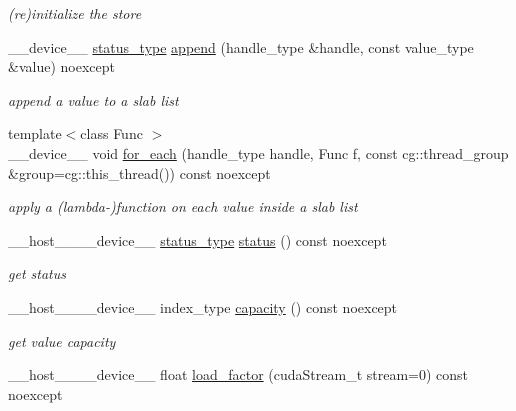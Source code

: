 \begin{DoxyCompactItemize}
\begin{DoxyCompactList}\small\item\em (re)initialize the store \end{DoxyCompactList}\item 
\+\_\+\+\_\+device\+\_\+\+\_\+ \hyperlink{classwarpcore_1_1Status}{status\+\_\+type} \hyperlink{classwarpcore_1_1storage_1_1multi__value_1_1StaticSlabListStore_a5433ed1a065db5277c6e4d3e6b55b628}{append} (handle\+\_\+type \&handle, const value\+\_\+type \&value) noexcept
\begin{DoxyCompactList}\small\item\em append a value to a slab list \end{DoxyCompactList}\item 
{\footnotesize template$<$class Func $>$ }\\\+\_\+\+\_\+device\+\_\+\+\_\+ void \hyperlink{classwarpcore_1_1storage_1_1multi__value_1_1StaticSlabListStore_ad156b26b427e55be66f74733b50f392d}{for\+\_\+each} (handle\+\_\+type handle, Func f, const cg\+::thread\+\_\+group \&group=cg\+::this\+\_\+thread()) const noexcept
\begin{DoxyCompactList}\small\item\em apply a (lambda-\/)function on each value inside a slab list \end{DoxyCompactList}\item 
\+\_\+\+\_\+host\+\_\+\+\_\+\+\_\+\+\_\+device\+\_\+\+\_\+ \hyperlink{classwarpcore_1_1Status}{status\+\_\+type} \hyperlink{classwarpcore_1_1storage_1_1multi__value_1_1StaticSlabListStore_a7a44a7afc0a793ff03ecd10a1d1c5c5a}{status} () const noexcept
\begin{DoxyCompactList}\small\item\em get status \end{DoxyCompactList}\item 
\+\_\+\+\_\+host\+\_\+\+\_\+\+\_\+\+\_\+device\+\_\+\+\_\+ index\+\_\+type \hyperlink{classwarpcore_1_1storage_1_1multi__value_1_1StaticSlabListStore_ac50c43e696d5cd11ba644d8ec442d088}{capacity} () const noexcept
\begin{DoxyCompactList}\small\item\em get value capacity \end{DoxyCompactList}\item 
\+\_\+\+\_\+host\+\_\+\+\_\+\+\_\+\+\_\+device\+\_\+\+\_\+ float \hyperlink{classwarpcore_1_1storage_1_1multi__value_1_1StaticSlabListStore_a8f740ca66f7e508d8d58c463d816b92e}{load\+\_\+factor} (cuda\+Stream\+\_\+t stream=0) const noexcept

\end{DoxyCompactItemize}
